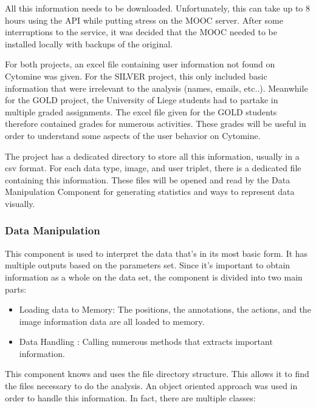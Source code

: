 \documentclass[a4paper,11pt]{report}
\numberwithin{figure}{section} %
\begin{document}
        
		All this information needs to be downloaded.
		Unfortunately, this can take up to 8 hours using the API while putting stress on the MOOC server.
		After some interruptions to the service, it was decided that the MOOC needed to be installed locally with backups of the original. \newline
        
        For both projects, an excel file containing user information not found on Cytomine was given.
        For the SILVER project, this only included basic information that were irrelevant to the analysis (names, emails, etc..).
        Meanwhile for the GOLD project, the University of Liege students had to partake in multiple graded assignments.
        The excel file given for the GOLD students therefore contained grades for numerous activities.
        These grades will be useful in order to understand some aspects of the user behavior on Cytomine. \newline
        
        
        The project has a dedicated directory to store all this information, usually in a csv format.
        For each data type, image, and user triplet, there is a dedicated file containing this information.
        These files will be opened and read by the Data Manipulation Component for generating statistics and ways to represent data visually.
        
        
	\subsubsection{Data Manipulation}
    
    This component is used to interpret the data that's in its most basic form.
    It has multiple outputs based on the parameters set.
    Since it's important to obtain information as a whole on the data set, the component is divided into two main parts:
    \begin{itemize}
        \item[\textbullet] Loading data to Memory: The positions, the annotations, the actions, and the image information data are all loaded to memory.
        \item[\textbullet] Data Handling : Calling numerous methods that extracts important information.
    \end{itemize}

    This component knows and uses the file directory structure.
    This allows it to find the files necessary to do the analysis.
    An object oriented approach was used in order to handle this information.
    In fact, there are multiple classes:
\end{document}
